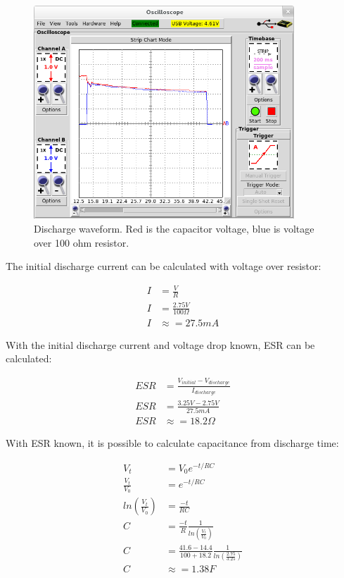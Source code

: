 \begin{figure}[htb]
\begin{center}
\includegraphics[height=8cm]{images/own_measurement/circuit/discharge.png}
\end{center}
\caption{\label{fig:scap_discharge} Discharge waveform. Red is the capacitor voltage, blue is voltage over 100 ohm resistor.}
\end{figure}

The initial discharge current can be calculated with voltage over resistor:

\begin{equation}
\begin{split}
  I &= \frac{V}{R} \\
  I &= \frac{2.75 V}{100 \Omega} \\
  I &\approx = 27.5 mA 
\end{split}
\end{equation}

With the initial discharge current and voltage drop known, ESR can be calculated:

\begin{equation}
\begin{split}
  ESR &= \frac{V_{initial} - V_{discharge}}{I_{discharge}} \\
  ESR &= \frac{3.25 V - 2.75 V}{27.5 mA} \\
  ESR &\approx = 18.2 \Omega
\end{split}
\end{equation}

With ESR known, it is possible to calculate capacitance from discharge time:

\begin{equation}
\begin{split}
  V_t                 &= V_{0}e^{-t/RC} \\
  \frac{V_t}{V_0}     &= e^{-t/RC} \\
  ln(\frac{V_t}{V_0}) &= \frac{-t}{RC} \\
  C                   &= \frac{-t}{R} \frac{1}{ ln(\frac{V_t}{V_0})} \\
  C                   &= \frac{41.6-14.4}{100 + 18.2} \frac{1}{ ln(\frac{2.75}{3.25})} \\
  C                   &\approx = 1.38 F
\end{split}
\end{equation}


